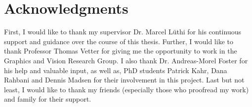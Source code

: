 \chapter{Acknowledgments}

First, I would like to thank my supervisor Dr. Marcel L{\"u}thi for his continuous support and guidance over the course of this thesis. Further, I would like to thank Professor Thomas Vetter for giving me the opportunity to work in the Graphics and Vision Research Group.  I also thank Dr. Andreas-Morel Foster for his help and valuable input, as well as, PhD students Patrick Kahr, Dana Rahbani and Dennis Madsen for their involvement in this project. Last but not least, I would like to thank my friends (especially those who proofread my work) and family for their support. 